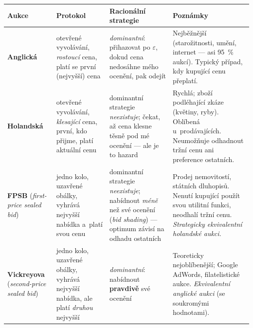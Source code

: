 \documentclass[11pt,a4paper]{article}
\theoremstyle{definition}
\begin{document}
\begin{center}\small
\begin{tabular}{@{}p{}
  >{\raggedright\arraybackslash}p{}
  >{\raggedright\arraybackslash}p{}
  >{\raggedright\arraybackslash}p{}@{}}
\toprule
\textbf{Aukce} & \textbf{Protokol} & \textbf{Racionální strategie} & \textbf{Poznámky} \\
\midrule
\textbf{Anglická}
  & otevřené vyvolávání, \emph{rostoucí} cena, platí se první (nejvyšší) cena
  & \emph{dominantní}: přihazovat po $\varepsilon$, dokud cena nedosáhne mého ocenění,
    pak odejít
  & Nejběžnější (starožitnosti, umění, internet --- asi 95~\% aukcí). Typický případ, kdy
    kupující cenu přeplatí. \\
\textbf{Holandská}
  & otevřené vyvolávání, \emph{klesající} cena, první, kdo přijme, platí aktuální cenu
  & dominantní strategie \emph{neexistuje}; čekat, až cena klesne těsně pod mé ocenění ---
    ale je to hazard
  & Rychlá; zboží podléhající zkáze (květiny, ryby). Oblíbená u~prodávajících.
    Neumožňuje odhadnout tržní cenu ani preference ostatních. \\
\textbf{FPSB} \newline (\emph{first-price sealed bid})
  & jedno kolo, uzavřené obálky, vyhrává nejvyšší nabídka a~platí svou cenu
  & dominantní strategie \emph{neexistuje}; nabídnout \emph{méně} než své ocenění
    (\emph{bid shading}) --- optimum závisí na odhadu ostatních
  & Prodej nemovitostí, státních dluhopisů. Nenutí kupující použít svou utilitní funkci,
    neodhalí tržní cenu. \emph{Strategicky ekvivalentní holandské aukci.} \\
\textbf{Vickreyova} \newline (\emph{second-price sealed bid})
  & jedno kolo, uzavřené obálky, vyhrává nejvyšší nabídka, ale platí \emph{druhou} nejvyšší
  & \emph{dominantní}: nabídnout \textbf{pravdivě} své ocenění
  & Teoreticky nejoblíbenější; Google AdWords, filatelistické aukce.
    \emph{Ekvivalentní anglické aukci} (se soukromými hodnotami). \\
\bottomrule
\end{tabular}
\end{center}
\end{document}
